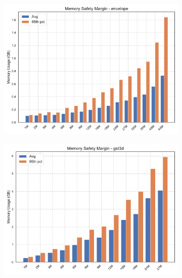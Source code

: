 \begin{figure}[htbp]
    \centering
    \begin{subfigure}[t]{0.49\textwidth}
        \centering
        \includegraphics[width=\textwidth]{assets/images/05/memory_safety_margin_envelope}
    \end{subfigure}
    \hfill
    \begin{subfigure}[t]{0.49\textwidth}
        \centering
        \includegraphics[width=\textwidth]{assets/images/05/memory_safety_margin_gst3d}
    \end{subfigure}
    \hfill
    \begin{subfigure}[t]{0.49\textwidth}
        \centering

\end{subfigure}
\end{figure}
